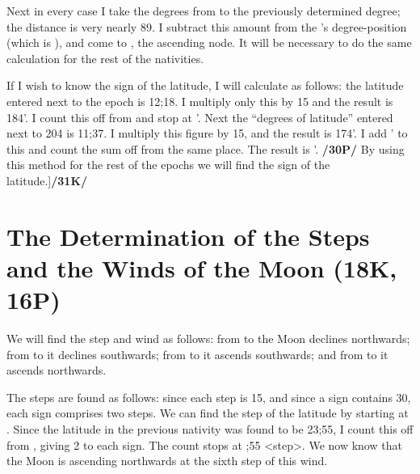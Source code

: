 Next in every case I take the degrees from \Taurus\xspace to the previously determined degree; the distance is very nearly 89\deg. I subtract this amount from the \Moon’s degree-position (which is \Scorpio\xspace 7\deg), and come to \Leo\xspace 8\deg, the ascending node. It will be necessary to do the same calculation for the rest of the nativities.

If I wish to know the sign of the latitude, I will calculate as follows: the latitude entered next to the epoch is 12;18. I multiply only this by 15\deg\xspace and the result is 184\deg\xspace 30'. I count this off from \Leo\xspace and stop
at \deg\xspace 30'. Next the “degrees of latitude” entered next to 204 is 11;37. I multiply this figure by
15\deg, and the result is 174\deg\xspace 15'. I add \Aquarius\xspace 4\deg\xspace 30' to this and count the sum off from the same place. The result is \deg\xspace 45'. \textbf{/30P/} By using this method for the rest of the epochs we will find the sign of the latitude.]\textbf{/31K/}

\newpage
\section{The Determination of the Steps and the Winds of the Moon (18K, 16P)}
We will find the step and wind as follows: from \Leo\xspace to \Libra\xspace the Moon declines northwards; from \Scorpio\xspace to \Capricorn\xspace it declines southwards; from \Aquarius\xspace to \Aries\xspace it ascends southwards; and from \Taurus\xspace to \Cancer\xspace it ascends northwards.

The steps are found as follows: since each step is 15\deg, and since a sign contains 30\deg, each sign comprises two steps. We can find the step of the latitude by starting at \Leo. Since the latitude in the previous nativity was found to be 23;55, I count this off from \Leo, giving 2 to each sign. The count stops at \Cancer\xspace 1;55 <step>. We now know that the Moon is ascending northwards at the sixth step of this wind.

\newpage